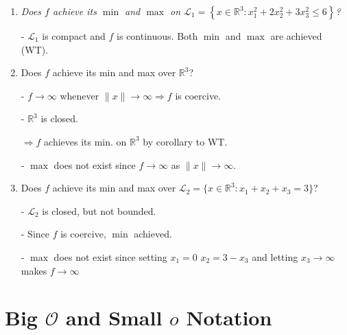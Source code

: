 \documentclass[11pt]{elegantbook}
\begin{document}
\begin{enumerate}[1)]
    \item \textit{Does $f$ achieve its $\min$ and $\max$ on $\mathcal{L}_{1}=\left\{x \in \mathbb{R}^{3}: x_{1}^{2}+2 x_{2}^{2}+3 x_{3}^{2} \leqslant 6\right\}$?}
    
    - $\mathcal{L}_{1}$ is compact and $f$ is continuous. Both $\min$ and $\max$ are achieved (WT).
    \item Does $f$ achieve its min and max over $\mathbb{R}^{3}$?
    
    - $f \rightarrow \infty$ whenever $\|x\| \rightarrow \infty \Rightarrow f$ is coercive.

    - $\mathbb{R}^{3}$ is closed.

    $\Rightarrow f$ achieves its min. on $\mathbb{R}^{3}$ by corollary to WT.

    - $\max$ does not exist since $f \rightarrow \infty$ as $\|x\| \rightarrow \infty$.

    \item Does $f$ achieve its min and max over $\mathcal{L}_{2}=\{x \in \mathbb{R}^{3}: x_{1}+x_{2}+x_{3}=3\}$?
    
    - $\mathcal{L}_{2}$ is closed, but not bounded.

    - Since $f$ is coercive, $\min$ achieved.

    - $\max$ does not exist since setting $x_{1}=0$ $x_{2}=3-x_{3}$ and letting $x_{3} \rightarrow \infty$ makes $f \rightarrow \infty$
\end{enumerate}








\chapter{Big $\mathcal{O}$ and Small $o$ Notation}
\end{document}
